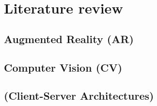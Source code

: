 \chapter{Literature review} \label{Literature review}

\section{Augmented Reality (AR)} \label{ar}

\section{Computer Vision (CV)} \label{cv}

\section{(Client-Server Architectures)} \label{csa}


